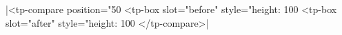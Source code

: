 \documentclass{article}
\begin{document}
\rawhtml|<tp-compare position="50%
  <tp-box slot="before" style="height: 100%
  <tp-box slot="after" style="height: 100%
</tp-compare>|
\end{document}
